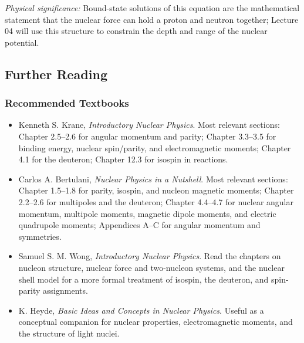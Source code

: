 \textit{Physical significance:} Bound-state solutions of this equation are the mathematical statement that the nuclear force can hold a proton and neutron together; Lecture 04 will use this structure to constrain the depth and range of the nuclear potential.

\subsection*{Further Reading}

\subsubsection*{Recommended Textbooks}
\begin{itemize}
  \item Kenneth S. Krane, \emph{Introductory Nuclear Physics}.  Most relevant sections: Chapter 2.5--2.6 for angular momentum and parity; Chapter 3.3--3.5 for binding energy, nuclear spin/parity, and electromagnetic moments; Chapter 4.1 for the deuteron; Chapter 12.3 for isospin in reactions.
  \item Carlos A. Bertulani, \emph{Nuclear Physics in a Nutshell}.  Most relevant sections: Chapter 1.5--1.8 for parity, isospin, and nucleon magnetic moments; Chapter 2.2--2.6 for multipoles and the deuteron; Chapter 4.4--4.7 for nuclear angular momentum, multipole moments, magnetic dipole moments, and electric quadrupole moments; Appendices A--C for angular momentum and symmetries.
  \item Samuel S. M. Wong, \emph{Introductory Nuclear Physics}.  Read the chapters on nucleon structure, nuclear force and two-nucleon systems, and the nuclear shell model for a more formal treatment of isospin, the deuteron, and spin-parity assignments.
  \item K. Heyde, \emph{Basic Ideas and Concepts in Nuclear Physics}.  Useful as a conceptual companion for nuclear properties, electromagnetic moments, and the structure of light nuclei.
\end{itemize}

